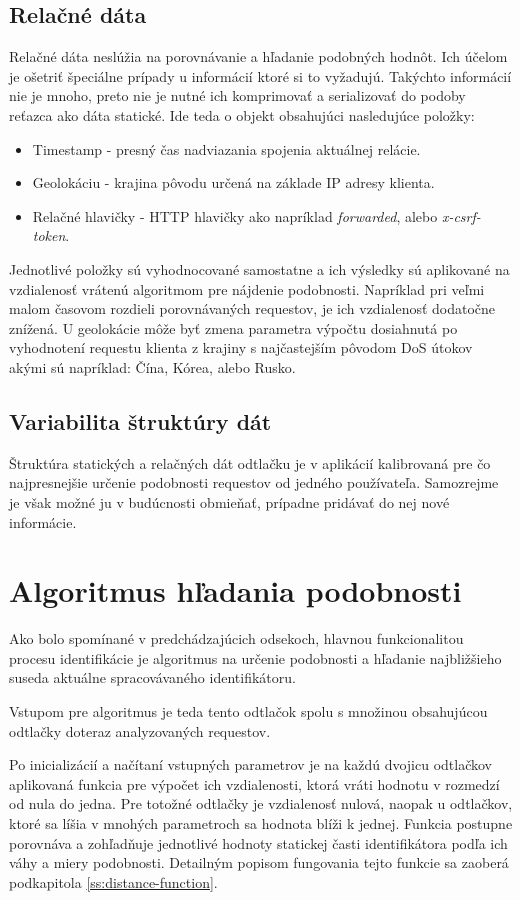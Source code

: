 \documentclass[
  digital, %
  table,   %
  lof,     %
  nolot,   %
  nocover
]{fithesis3}
\begin{document}
\subsection{Relačné dáta}
Relačné dáta neslúžia na porovnávanie a hľadanie podobných hodnôt. Ich účelom
je ošetriť špeciálne prípady u informácií ktoré si to vyžadujú. Takýchto
informácií nie je mnoho, preto nie je nutné ich komprimovať a serializovať do podoby reťazca ako
dáta statické.
Ide teda o objekt obsahujúci nasledujúce položky:
\begin{itemize}
    \item Timestamp - presný čas nadviazania spojenia aktuálnej relácie.
    \item Geolokáciu - krajina pôvodu určená na základe IP adresy klienta.
    \item Relačné hlavičky - HTTP hlavičky ako napríklad
    \textit{forwarded}, alebo \textit{x-csrf-token}. 
\end{itemize}

Jednotlivé položky sú vyhodnocované samostatne a ich výsledky sú aplikované na
vzdialenosť vrátenú algoritmom pre nájdenie podobnosti. Napríklad pri veľmi
malom časovom rozdieli porovnávaných requestov, je ich vzdialenosť dodatočne
znížená. U geolokácie môže byť zmena parametra výpočtu dosiahnutá po vyhodnotení requestu
klienta z krajiny s najčastejším pôvodom DoS útokov akými sú napríklad: Čína,
Kórea, alebo Rusko.

\subsection{Variabilita štruktúry dát}
Štruktúra statických a relačných dát odtlačku je v aplikácií kalibrovaná
pre čo najpresnejšie určenie podobnosti requestov od jedného používateľa.
Samozrejme je však možné ju v budúcnosti obmieňať, prípadne pridávať do nej
nové informácie.

\section{Algoritmus hľadania podobnosti}
\label{s:similarity-search}
Ako bolo spomínané v predchádzajúcich odsekoch, hlavnou funkcionalitou procesu identifikácie je
algoritmus na určenie podobnosti a hľadanie najbližšieho suseda aktuálne
spracovávaného identifikátoru. 

Vstupom pre algoritmus je teda tento odtlačok
spolu s množinou obsahujúcou odtlačky doteraz analyzovaných requestov.

Po
inicializácií a načítaní vstupných parametrov je na každú dvojicu odtlačkov
aplikovaná funkcia pre výpočet ich vzdialenosti, ktorá vráti hodnotu v rozmedzí
od nula do jedna. Pre totožné odtlačky je vzdialenosť nulová, naopak u
odtlačkov, ktoré sa líšia v mnohých parametroch sa hodnota blíži k jednej.
Funkcia postupne porovnáva a zohľadňuje jednotlivé hodnoty statickej časti
identifikátora podľa ich váhy a miery podobnosti. Detailným popisom fungovania
tejto funkcie sa zaoberá podkapitola \ref{ss:distance-function}. 
\end{document}
